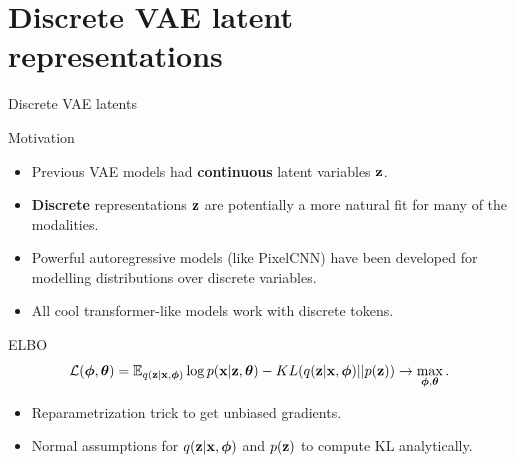 \section{Discrete VAE latent representations}
\begin{frame}{Discrete VAE latents}
	\begin{block}{Motivation}
		\begin{itemize}
			\item Previous VAE models had \textbf{continuous} latent variables $\mathbf{z}$.
			\item \textbf{Discrete} representations $\mathbf{z}$ are potentially a more natural fit for many of the modalities.
			\item Powerful autoregressive models (like PixelCNN) have been developed for modelling distributions over discrete variables.
			\item All cool transformer-like models work with discrete tokens.
		\end{itemize}
	\end{block}
	\begin{block}{ELBO}
		\vspace{-0.3cm}
		\[
		\mathcal{L} (\boldsymbol{\phi}, \boldsymbol{\theta})  = \mathbb{E}_{q(\mathbf{z} | \mathbf{x}, \boldsymbol{\phi})} \log p(\mathbf{x} | \mathbf{z} , \boldsymbol{\theta}) - KL(q(\mathbf{z}| \mathbf{x}, \boldsymbol{\phi}) || p(\mathbf{z})) \rightarrow \max_{\boldsymbol{\phi}, \boldsymbol{\theta}}.
		\]
		\vspace{-0.5cm}
	\end{block}
	\begin{itemize}
		\item Reparametrization trick to get unbiased gradients.
		\item Normal assumptions for $q(\mathbf{z} | \mathbf{x}, \boldsymbol{\phi})$ and $p(\mathbf{z})$ to compute KL analytically.
	\end{itemize}
\end{frame}
